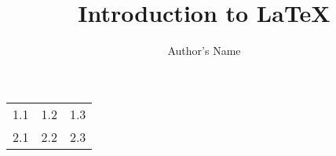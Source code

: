 \usepackage{graphicx}



\title{Introduction to \LaTeX{}}
\author{Author's Name}

\maketitle

\begin{tabular}{lll}
   1.1 & 1.2 & 1.3 \\
   2.1 & 2.2 & 2.3 \\
\end{tabular}



